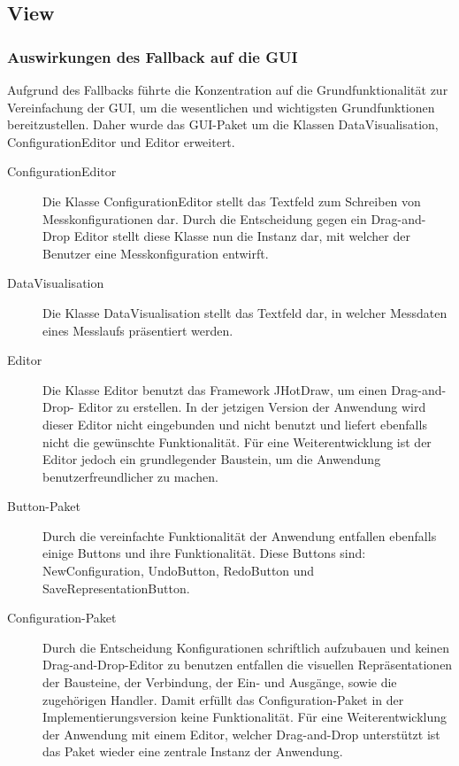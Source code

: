 \documentclass[parskip=full]{scrartcl}
\begin{document}
\subsection{View}


\subsubsection{Auswirkungen des Fallback auf die GUI}

Aufgrund des Fallbacks führte die Konzentration auf die Grundfunktionalität zur Vereinfachung der GUI, um die wesentlichen und wichtigsten Grundfunktionen bereitzustellen. Daher wurde das GUI-Paket um die Klassen DataVisualisation, ConfigurationEditor und Editor erweitert.

\begin{description}
\item[ConfigurationEditor] Die Klasse ConfigurationEditor stellt das Textfeld zum Schreiben von Messkonfigurationen dar. Durch die Entscheidung gegen ein Drag-and-Drop Editor stellt diese Klasse nun die Instanz dar, mit welcher der Benutzer eine Messkonfiguration entwirft.
\item[DataVisualisation] Die Klasse DataVisualisation stellt das Textfeld dar, in welcher Messdaten eines Messlaufs präsentiert werden.
\item[Editor] Die Klasse Editor benutzt das Framework JHotDraw, um einen Drag-and-Drop- Editor zu erstellen. In der jetzigen Version der Anwendung wird dieser Editor nicht eingebunden und nicht benutzt und liefert ebenfalls nicht die gewünschte Funktionalität. Für eine Weiterentwicklung ist der Editor jedoch ein grundlegender Baustein, um die Anwendung benutzerfreundlicher zu machen.

\item[Button-Paket] Durch die vereinfachte Funktionalität der Anwendung entfallen ebenfalls einige Buttons und ihre Funktionalität. Diese Buttons sind: NewConfiguration, UndoButton, RedoButton und SaveRepresentationButton.


\item[Configuration-Paket]

Durch die Entscheidung Konfigurationen schriftlich aufzubauen und keinen Drag-and-Drop-Editor zu benutzen entfallen die visuellen Repräsentationen der Bausteine, der Verbindung, der Ein- und Ausgänge, sowie die zugehörigen Handler. Damit erfüllt das Configuration-Paket in der Implementierungsversion keine Funktionalität. Für eine Weiterentwicklung der Anwendung mit einem Editor, welcher Drag-and-Drop unterstützt ist das Paket wieder eine zentrale Instanz der Anwendung. 


\end{description}
\end{document}
